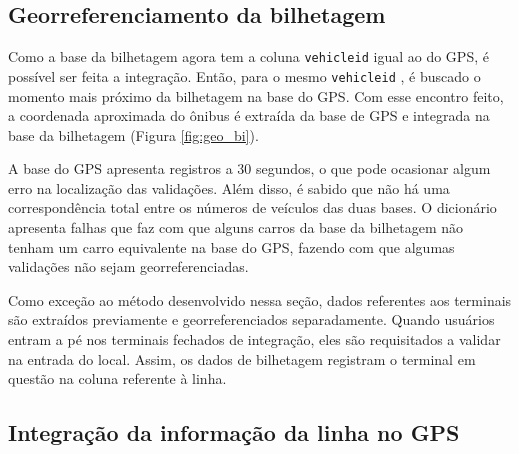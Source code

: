 \documentclass[        
    a4paper,          %
    12pt,             %
    chapter=TITLE,    %
    section=Title,    %
    subsection=Title, %
    oneside,          %
    english,          %
    spanish,          %
    brazil,           %
    fleqn             %
]{abntex2}
\let\oldtexttt\texttt
\renewcommand{\texttt}[1]{
  \colorbox{bgcolor}{\oldtexttt{#1}}
}
\begin{document}
  \hypertarget{georreferenciamento-da-bilhetagem}{%
  \subsection{Georreferenciamento da bilhetagem}\label{georreferenciamento-da-bilhetagem}}
  
  Como a base da bilhetagem agora tem a coluna \texttt{vehicleid} igual ao do GPS, é possível ser feita a integração. Então, para o mesmo \texttt{vehicleid}, é buscado o momento mais próximo da bilhetagem na base do GPS. Com esse encontro feito, a coordenada aproximada do ônibus é extraída da base de GPS e integrada na base da bilhetagem (Figura \ref{fig:geo_bi}).
  
  \begin{figure}[!h]
  \captionsetup{width=16cm}
  \centering
  \end{figure}
  
  A base do GPS apresenta registros a 30 segundos, o que pode ocasionar algum erro na localização das validações. Além disso, é sabido que não há uma correspondência total entre os números de veículos das duas bases. O dicionário apresenta falhas que faz com que alguns carros da base da bilhetagem não tenham um carro equivalente na base do GPS, fazendo com que algumas validações não sejam georreferenciadas.
  
  Como exceção ao método desenvolvido nessa seção, dados referentes aos terminais são extraídos previamente e georreferenciados separadamente. Quando usuários entram a pé nos terminais fechados de integração, eles são requisitados a validar na entrada do local. Assim, os dados de bilhetagem registram o terminal em questão na coluna referente à linha.
  
  \hypertarget{integracao-da-informacao-da-linha-no-gps}{%
  \subsection{Integração da informação da linha no GPS}\label{integracao-da-informacao-da-linha-no-gps}}
  
\end{document}
